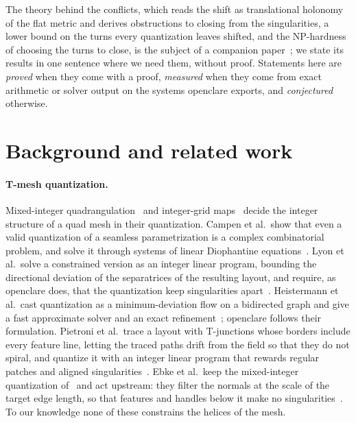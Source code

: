 \documentclass[11pt,a4paper]{article}
\begin{document}
The theory behind the conflicts, which reads the shift as translational
holonomy of the flat metric and derives obstructions to closing from the
singularities, a lower bound on the turns every quantization leaves shifted,
and the NP-hardness of choosing the turns to close, is the subject of a
companion paper~\cite{gardent2026turns}; we state its results in one
sentence where we need them, without proof. Statements here are
\emph{proved} when they come with a proof, \emph{measured} when they come
from exact arithmetic or solver output on the systems openclare exports, and
\emph{conjectured} otherwise.

\section{Background and related work}\label{sec:related}

\paragraph{T-mesh quantization.}
Mixed-integer quadrangulation~\cite{bommes2009miq} and integer-grid
maps~\cite{bommes2013igm} decide the integer structure of a quad mesh in
their quantization. Campen et al.\ show that even a valid quantization of a seamless
parametrization is a complex combinatorial problem, and solve it through
systems of linear Diophantine equations~\cite{campen2015qgp}.
Lyon et al.\ solve a constrained version as an integer linear program,
bounding the directional deviation of the separatrices of the resulting
layout, and require, as openclare does, that the quantization keep
singularities apart~\cite{lyon2021constrained}. Heistermann et al.\ cast
quantization as a minimum-deviation flow on a bidirected graph and give a
fast approximate solver and an exact refinement~\cite{heistermann2023bimdf};
openclare follows their formulation. Pietroni et al.\ trace a layout with
T-junctions whose borders include every feature line, letting the traced
paths drift from the field so that they do not spiral, and quantize it with
an integer linear program that rewards regular patches and aligned
singularities~\cite{pietroni2021reliable}. Ebke et al.\ keep the
mixed-integer quantization of~\cite{bommes2009miq} and act upstream: they
filter the normals at the scale of the target edge length, so that features
and handles below it make no singularities~\cite{ebke2014lod}. To our
knowledge none of these constrains the helices of the mesh.
\end{document}
